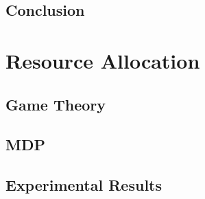 \documentclass[a4paper, 11pt]{article}
\begin{document}
\subsection{Conclusion}


\newpage
\section{Resource Allocation}
\subsection{Game Theory}
\subsection{MDP}
% 
\subsection{Experimental Results}



\newpage
{}


\newpage
\begin{appendices}

\end{appendices}
\end{document}
